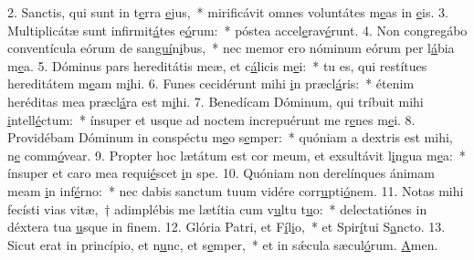 2. Sanctis, qui sunt in t\uline{e}rra \uline{e}jus,~* mirificávit omnes voluntátes m\uline{e}as in \uline{e}is.
3. Multiplicátæ sunt infirmit\uline{á}tes e\uline{ó}rum:~* póstea accel\uline{e}rav\uline{é}runt.
4. Non congregábo conventícula eórum de san\uline{guí}n\uline{i}bus,~* nec memor ero nóminum eórum per l\uline{á}bia m\uline{e}a.
5. Dóminus pars hereditátis meæ, et c\uline{á}licis m\uline{e}i:~* tu es, qui restítues hereditátem m\uline{e}am m\uline{i}hi.
6. Funes cecidérunt mihi \uline{i}n præcl\uline{á}ris:~* étenim heréditas mea præcl\uline{á}ra est m\uline{i}hi.
7. Benedícam Dóminum, qui tríbuit mihi \uline{i}ntell\uline{é}ctum:~* ínsuper et usque ad noctem increpuérunt me r\uline{e}nes m\uline{e}i.
8. Providébam Dóminum in conspéctu m\uline{e}o s\uline{e}mper:~* quóniam a dextris est mihi, n\uline{e} comm\uline{ó}vear.
9. Propter hoc lætátum est cor meum, et exsultávit l\uline{i}ngua m\uline{e}a:~* ínsuper et caro mea requi\uline{é}scet \uline{i}n spe.
10. Quóniam non derelínques ánimam meam \uline{i}n inf\uline{é}rno:~* nec dabis sanctum tuum vidére corr\uline{u}pti\uline{ó}nem.
11. Notas mihi fecísti vias vitæ,~† adimplébis me lætítia cum v\uline{u}ltu t\uline{u}o:~* delectatiónes in déxtera tua \uline{u}sque in f\uline{i}nem.
12. Glória Patri, et F\uline{í}l\uline{i}o,~* et Spir\uline{í}tui S\uline{a}ncto.
13. Sicut erat in princípio, et n\uline{u}nc, et s\uline{e}mper,~* et in sǽcula sæcul\uline{ó}rum. \uline{A}men.
